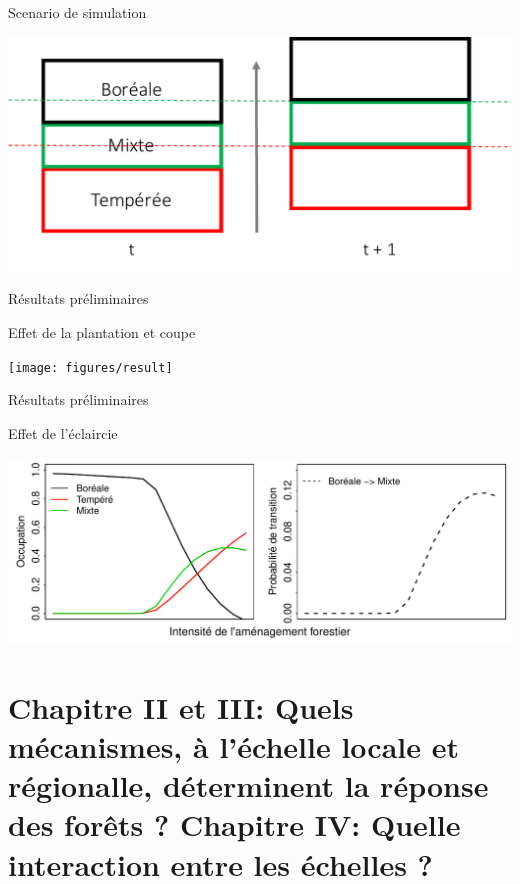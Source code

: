 \documentclass[11pt, compress, aspectratio=1610]{beamer}
\let\OldTexttt\texttt
\renewcommand{\texttt}[1]{\OldTexttt{\color{plTT}#1}}
\begin{document}
\begin{frame}{Scenario de simulation}

\centering
 \includegraphics[scale=0.65]{figures/migration.pdf}\par

\end{frame}

\begin{frame}{Résultats préliminaires}

Effet de la plantation et coupe

\centering
 \texttt{[image: figures/result]}\par

\end{frame}

\begin{frame}{Résultats préliminaires}

Effet de l'éclaircie

\centering
 \includegraphics[scale=0.65]{figures/result1.pdf}\par

\end{frame}

\section{\texorpdfstring{Chapitre II et III: \newline Quels mécanismes,
à l'échelle locale et régionalle, déterminent la réponse des forêts ?
\newline Chapitre IV: \newline Quelle interaction entre les échelles
?}{Chapitre II et III: Quels mécanismes, à l'échelle locale et régionalle, déterminent la réponse des forêts ? Chapitre IV: Quelle interaction entre les échelles ?}}\label{chapitre-ii-et-iii-quels-muxe9canismes-uxe0-luxe9chelle-locale-et-ruxe9gionalle-duxe9terminent-la-ruxe9ponse-des-foruxeats-chapitre-iv-quelle-interaction-entre-les-uxe9chelles}
\end{document}
